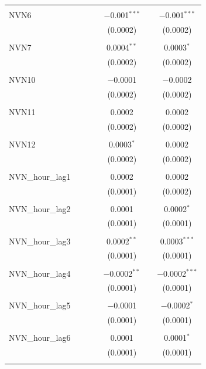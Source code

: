 \begin{table}[!htbp]
\begin{tabular}{@{\extracolsep{5pt}}lcccccc}
  & & & & & & \\ 
 NVN6 &  &  &  & $-$0.001$^{***}$ &  & $-$0.001$^{***}$ \\ 
  &  &  &  & (0.0002) &  & (0.0002) \\ 
  & & & & & & \\ 
 NVN7 &  &  &  & 0.0004$^{**}$ &  & 0.0003$^{*}$ \\ 
  &  &  &  & (0.0002) &  & (0.0002) \\ 
  & & & & & & \\ 
 NVN10 &  &  &  & $-$0.0001 &  & $-$0.0002 \\ 
  &  &  &  & (0.0002) &  & (0.0002) \\ 
  & & & & & & \\ 
 NVN11 &  &  &  & 0.0002 &  & 0.0002 \\ 
  &  &  &  & (0.0002) &  & (0.0002) \\ 
  & & & & & & \\ 
 NVN12 &  &  &  & 0.0003$^{*}$ &  & 0.0002 \\ 
  &  &  &  & (0.0002) &  & (0.0002) \\ 
  & & & & & & \\ 
 NVN\_hour\_lag1 &  &  &  & 0.0002 &  & 0.0002 \\ 
  &  &  &  & (0.0001) &  & (0.0002) \\ 
  & & & & & & \\ 
 NVN\_hour\_lag2 &  &  &  & 0.0001 &  & 0.0002$^{*}$ \\ 
  &  &  &  & (0.0001) &  & (0.0001) \\ 
  & & & & & & \\ 
 NVN\_hour\_lag3 &  &  &  & 0.0002$^{**}$ &  & 0.0003$^{***}$ \\ 
  &  &  &  & (0.0001) &  & (0.0001) \\ 
  & & & & & & \\ 
 NVN\_hour\_lag4 &  &  &  & $-$0.0002$^{**}$ &  & $-$0.0002$^{***}$ \\ 
  &  &  &  & (0.0001) &  & (0.0001) \\ 
  & & & & & & \\ 
 NVN\_hour\_lag5 &  &  &  & $-$0.0001 &  & $-$0.0002$^{*}$ \\ 
  &  &  &  & (0.0001) &  & (0.0001) \\ 
  & & & & & & \\ 
 NVN\_hour\_lag6 &  &  &  & 0.0001 &  & 0.0001$^{*}$ \\ 
  &  &  &  & (0.0001) &  & (0.0001) \\ 
  & & & & & & \\ 

\end{tabular}
\end{table}
